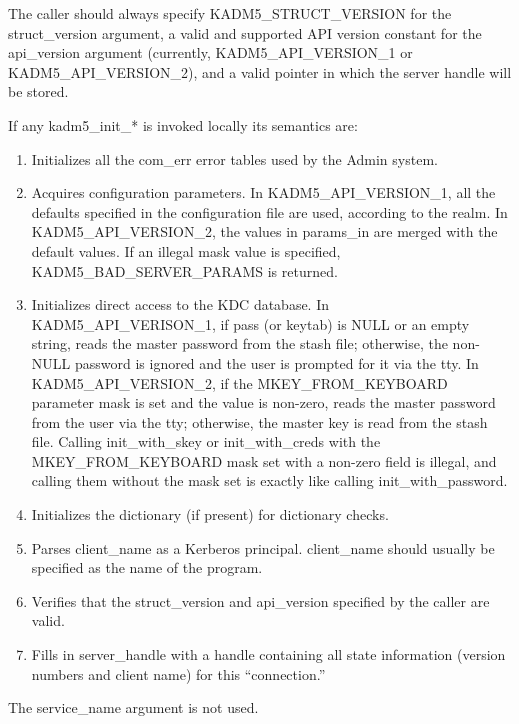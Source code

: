 The caller should always specify KADM5_STRUCT_VERSION for the
struct_version argument, a valid and supported API version constant
for the api_version argument (currently, KADM5_API_VERSION_1 or
KADM5_API_VERSION_2), and a valid pointer in which the server handle
will be stored.

If any kadm5_init_* is invoked locally its semantics are:

\begin{enumerate}
\item Initializes all the com_err error tables used by the Admin
system.

\item Acquires configuration parameters.  In KADM5_API_VERSION_1, all
the defaults specified in the configuration file are used, according
to the realm.  In KADM5_API_VERSION_2, the values in params_in are
merged with the default values.  If an illegal mask value is
specified, KADM5_BAD_SERVER_PARAMS is returned.

\item Initializes direct access to the KDC database.  In
KADM5_API_VERISON_1, if pass (or keytab) is NULL or an empty string,
reads the master password from the stash file; otherwise, the non-NULL
password is ignored and the user is prompted for it via the tty.  In
KADM5_API_VERSION_2, if the MKEY_FROM_KEYBOARD parameter mask is set
and the value is non-zero, reads the master password from the user via
the tty; otherwise, the master key is read from the stash file.
Calling init_with_skey or init_with_creds with the MKEY_FROM_KEYBOARD
mask set with a non-zero field is illegal, and calling them without
the mask set is exactly like calling init_with_password.

\item Initializes the dictionary (if present) for dictionary checks.

\item Parses client_name as a Kerberos principal.  client_name should
usually be specified as the name of the program.

\item Verifies that the struct_version and api_version specified by
the caller are valid.

\item Fills in server_handle with a handle containing all state
information (version numbers and client name) for this ``connection.''
\end{enumerate}
The service_name argument is not used.

